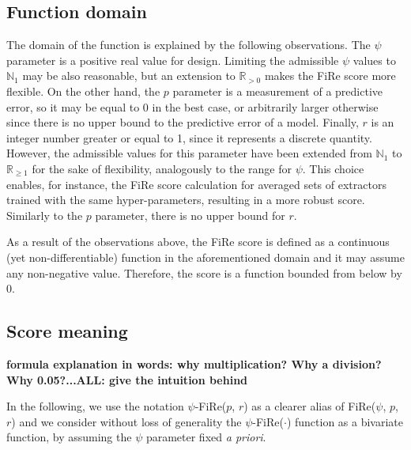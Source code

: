 \documentclass{article}
\newcommand{\fire}{FiRe}
\newcommand{\psifire}{$\psi$-\fire}
\begin{document}
\subsection{Function domain}\label{sec:fire-domain}
The domain of the function is explained by the following observations.
%
The $\psi$ parameter is a positive real value for design.
%
Limiting the admissible $\psi$ values to $\mathbb{N}_1$ may be also reasonable, but an extension to $\mathbb{R}_{>0}$ makes the \fire{} score more flexible.
%
On the other hand, the $p$ parameter is a measurement of a predictive error, so it may be equal to 0 in the best case, or arbitrarily larger otherwise since there is no upper bound to the predictive error of a model.
%
Finally, $r$ is an integer number greater or equal to 1, since it represents a discrete quantity.
%
However, the admissible values for this parameter have been extended from $\mathbb{N}_1$ to $\mathbb{R}_{\geq 1}$ for the sake of flexibility, analogously to the range for $\psi$.
%
This choice enables, for instance, the \fire{} score calculation for averaged sets of extractors trained with the same hyper-parameters, resulting in a more robust score.
%
Similarly to the $p$ parameter, there is no upper bound for $r$.

As a result of the observations above, the \fire{} score is defined as a continuous (yet non-differentiable) function in the aforementioned domain and it may assume any non-negative value.
%
Therefore, the score is a function bounded from below by 0.

\subsection{Score meaning}\label{sec:fire-meaning}
\textbf{formula explanation in words: why multiplication? Why a division? Why 0.05?...ALL: give the intuition behind}

In the following, we use the notation \psifire{}($p$, $r$) as a clearer alias of \fire{}($\psi$, $p$, $r$) and we consider without loss of generality the \psifire{}($\cdot$) function as a bivariate function, by assuming the $\psi$ parameter fixed \emph{a priori}.
\end{document}
